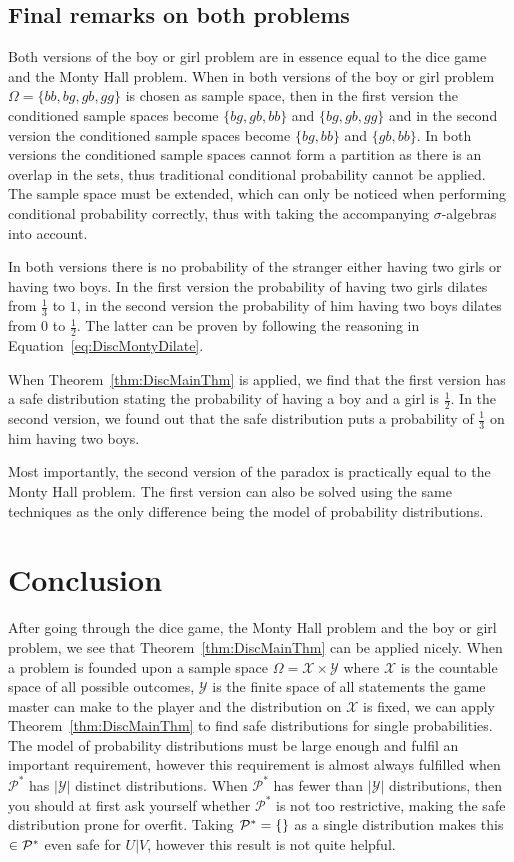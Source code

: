 \documentclass[a4paper]{report}
\theoremstyle{plain}
\theoremstyle{definition}
\theoremstyle{remark}
\numberwithin{equation}{chapter}
\let\P\relax
\DeclareMathOperator{\P}{\mathbb{P}}
\DeclareMathOperator{\1}{\mathbbm{1}}
\newcommand{\X}{\mathcal{X}}
\newcommand{\Y}{\mathcal{Y}}
\newcommand{\Pmod}{\mathcal{P}^*}
\begin{document}
\subsection{Final remarks on both problems}
Both versions of the boy or girl problem are in essence equal to the dice game and the Monty Hall problem. When in both versions of the boy or girl problem $\Omega=\{bb,bg,gb,gg\}$ is chosen as sample space, then in the first version the conditioned sample spaces become $\{bg, gb, bb\}$ and $\{bg, gb, gg\}$ and in the second version the conditioned sample spaces become $\{bg, bb\}$ and $\{gb, bb\}$. In both versions the conditioned sample spaces cannot form a partition as there is an overlap in the sets, thus traditional conditional probability cannot be applied. The sample space must be extended, which can only be noticed when performing conditional probability correctly, thus with taking the accompanying $\sigma$-algebras into account.

In both versions there is no probability of the stranger either having two girls or having two boys. In the first version the probability of having two girls dilates from $\frac{1}{3}$ to $1$, in the second version the probability of him having two boys dilates from $0$ to $\frac{1}{2}$. The latter can be proven by following the reasoning in Equation~\ref{eq:DiscMontyDilate}.

When Theorem~\ref{thm:DiscMainThm} is applied, we find that the first version has a safe distribution stating the probability of having a boy and a girl is $\frac{1}{2}$. In the second version, we found out that the safe distribution puts a probability of $\frac{1}{3}$ on him having two boys.

Most importantly, the second version of the paradox is practically equal to the Monty Hall problem. The first version can also be solved using the same techniques as the only difference being the model of probability distributions.

\section{Conclusion}\label{sec:DiscConcl}
After going through the dice game, the Monty Hall problem and the boy or girl problem, we see that Theorem~\ref{thm:DiscMainThm} can be applied nicely. When a problem is founded upon a sample space $\Omega=\X\times\Y$ where $\X$ is the countable space of all possible outcomes, $\Y$ is the finite space of all statements the game master can make to the player and the distribution on $\X$ is fixed, we can apply Theorem~\ref{thm:DiscMainThm} to find safe distributions for single probabilities. The model of probability distributions must be large enough and fulfil an important requirement, however this requirement is almost always fulfilled when $\Pmod$ has $|\Y|$ distinct distributions. When $\Pmod$ has fewer than $|\Y|$ distributions, then you should at first ask yourself whether $\Pmod$ is not too restrictive, making the safe distribution prone for overfit. Taking $\Pmod=\{\P\}$ as a single distribution makes this $\P\in\Pmod$ even safe for $U|V$, however this result is not quite helpful.
\end{document}
